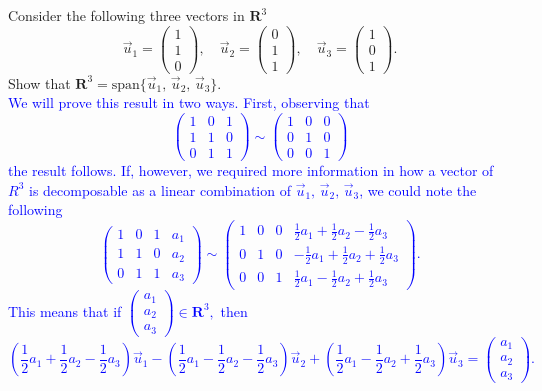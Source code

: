 \documentclass[a4paper,11pt]{article}
\newcommand{\R}{\mathbf{R}}
\newcommand{\BB}[1]{\textcolor{blue}{#1}}
\begin{document}
 Consider the following three vectors in $\R^3$
\[
  \vec u_1 = \begin{pmatrix}1\\1\\0\end{pmatrix},\quad
  \vec u_2 = \begin{pmatrix}0\\1\\1\end{pmatrix},\quad
  \vec u_3 = \begin{pmatrix}1\\0\\1\end{pmatrix}.
\]
Show that $\R^3=\text{span}\{\vec u_1,\,\vec u_2,\,\vec u_3\}$. \\

\BB{We will prove this result in two ways. First, observing that
  \[
    \left(
      \begin{array}{rrr}
        1 & 0 & 1 \\
        1 & 1 & 0 \\
        0 & 1 & 1
      \end{array}
    \right)
    \sim
    \left(
      \begin{array}{rrr}
        1 & 0 & 0 \\
        0 & 1 & 0 \\
        0 & 0 & 1
      \end{array}
    \right)
  \]
  the result follows. If, however, we required more information in how a vector
  of $R^3$ is decomposable as a linear combination of $\vec u_1,\,\vec u_2,\,\vec
  u_3$, we could note the following
  \[
    \left(
      \begin{array}{rrrr}
        1 & 0 & 1 & a_1 \\
        1 & 1 & 0 & a_2 \\
        0 & 1 & 1 & a_3
      \end{array}
    \right) 
    \sim
    \left(
      \begin{array}{rrrr}
        1 & 0 & 0 & \frac{1}{2}a_1+\frac{1}{2}a_2-\frac{1}{2}a_3 \\
        0 & 1 & 0 & -\frac{1}{2}a_1+\frac{1}{2}a_2+\frac{1}{2}a_3 \\
        0 & 0 & 1 & \frac{1}{2}a_1-\frac{1}{2}a_2+\frac{1}{2}a_3
      \end{array}
    \right).
  \]
  This means that if
  $
  \left(
    \begin{smallmatrix}
      a_1\\a_2\\a_3
    \end{smallmatrix}
  \right)
  \in \R^3,
  $
  then
  \[
    \left( \frac{1}{2}a_1+\frac{1}{2}a_2-\frac{1}{2}a_3 \right)\vec u_1-
    \left( \frac{1}{2}a_1-\frac{1}{2}a_2-\frac{1}{2}a_3 \right)\vec u_2+
    \left( \frac{1}{2}a_1-\frac{1}{2}a_2+\frac{1}{2}a_3 \right)\vec u_3=
    \begin{pmatrix}a_1\\a_2\\a_3\end{pmatrix}.
  \] \\
}
\end{document}
